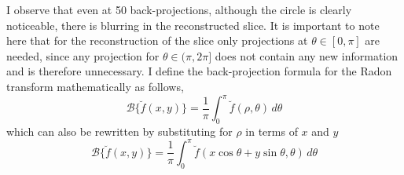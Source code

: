 \documentclass[12pt]{article}
\begin{document}
I observe that even at 50 back-projections, although the circle is clearly noticeable, there is blurring in the reconstructed slice. It is important to note here that for the reconstruction of the slice only projections at $\theta \in [0, \pi]$ are needed, since any projection for $\theta \in (\pi, 2\pi]$ does not contain any new information and is therefore unnecessary.
I define the back-projection formula for the Radon transform mathematically as follows,
\begin{equation}\label{eq.12}
	\mathcal{B}\{\breve{f}(x, y)\} = \frac{1}{\pi}\int_{0}^{\pi} \breve{f}(\rho, \theta)\, d\theta
\end{equation}
which can also be rewritten by substituting for $\rho$ in terms of $x$ and $y$
\begin{equation}\label{eq.13}
	\mathcal{B}\{\breve{f}(x, y)\} = \frac{1}{\pi}\int_{0}^{\pi} \breve{f}(x\cos{\theta}+y\sin{\theta}, \theta)\, d\theta
\end{equation}
\end{document}
